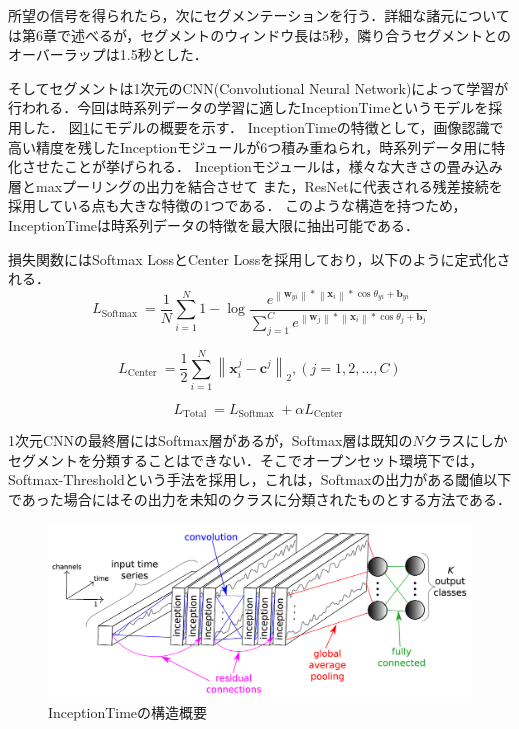 所望の信号を得られたら，次にセグメンテーションを行う．詳細な諸元については第6章で述べるが，セグメントのウィンドウ長は5秒，隣り合うセグメントとのオーバーラップは1.5秒とした．

そしてセグメントは1次元のCNN(Convolutional Neural Network)によって学習が行われる．今回は時系列データの学習に適したInceptionTime\cite{paper:InceptionTime}というモデルを採用した．
図\ref{fig:InceptionTime}にモデルの概要を示す．
InceptionTimeの特徴として，画像認識で高い精度を残したInceptionモジュール\cite{paper:Inception}が6つ積み重ねられ，時系列データ用に特化させたことが挙げられる．
Inceptionモジュールは，様々な大きさの畳み込み層とmaxプーリングの出力を結合させて
また，ResNet\cite{paper:ResNet}に代表される残差接続を採用している点も大きな特徴の1つである．
このような構造を持つため，InceptionTimeは時系列データの特徴を最大限に抽出可能である．

損失関数にはSoftmax LossとCenter Lossを採用しており，以下のように定式化される．
\begin{equation}{L_{{\text{Softmax }}}} = \frac{1}{N}\sum\limits_{i = 1}^N 1 - \log \frac{{{e^{\left\| {{{\mathbf{w}}_{yi}}} \right\|*\left\| {{{\mathbf{x}}_i}} \right\|*\cos {\theta _{yi}} + {{\mathbf{b}}_{yi}}}}}}{{\sum\limits_{j = 1}^C {{e^{\left\| {{{\mathbf{w}}_j}} \right\|*\left\| {{{\mathbf{x}}_i}} \right\|*\cos {\theta _j} + {{\mathbf{b}}_j}}}} }}\tag{1}\end{equation}

\begin{equation}{L_{{\text{Center }}}} = \frac{1}{2}\sum\limits_{i = 1}^N {{{\left\| {{\mathbf{x}}_i^j - {{\mathbf{c}}^j}} \right\|}_2}} ,(j = 1,2, \ldots ,C)\tag{2}\end{equation}

\begin{equation}{L_{{\text{Total }}}} = {L_{{\text{Softmax }}}} + \alpha {L_{{\text{Center }}}}\end{equation}

1次元CNNの最終層にはSoftmax層があるが，Softmax層は既知の$N$クラスにしかセグメントを分類することはできない．そこでオープンセット環境下では，Softmax-Thresholdという手法を採用し，これは，Softmaxの出力がある閾値以下であった場合にはその出力を未知のクラスに分類されたものとする方法である．


\begin{figure}[H]
\begin{center}
\includegraphics[width=\linewidth]{./fig/InceptionTime.png}
\end{center}
\caption{InceptionTimeの構造概要}
\label{fig:InceptionTime}
\end{figure}

